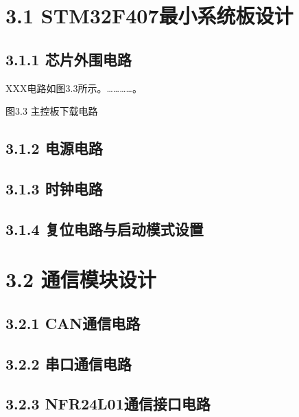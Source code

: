 \documentclass[UTF8,zihao=-4,openany,oneside]{ctexbook}
\begin{document}
\section{3.1 STM32F407最小系统板设计}

\subsection{3.1.1 芯片外围电路}

XXX电路如图3.3所示。…………。

\begin{center}
\end{center}

\begin{center}图3.3 主控板下载电路\end{center}

\subsection{3.1.2 电源电路}

\subsection{3.1.3 时钟电路}

\subsection{3.1.4 复位电路与启动模式设置}

\section{3.2 通信模块设计}

\subsection{3.2.1 CAN通信电路}

\subsection{3.2.2 串口通信电路}

\subsection{3.2.3 NFR24L01通信接口电路}
\end{document}
